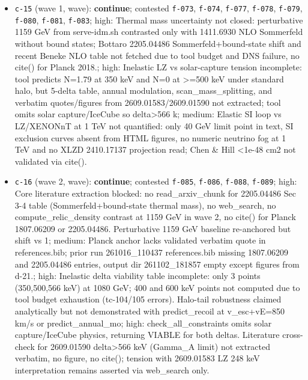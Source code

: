 \documentclass[11pt,a4paper]{article}
\begin{document}
\begin{itemize}
  \item \texttt{c-15} (wave 1, wave): \textbf{continue}; contested \texttt{f-073}, \texttt{f-074}, \texttt{f-077}, \texttt{f-078}, \texttt{f-079}, \texttt{f-080}, \texttt{f-081}, \texttt{f-083}; high: Thermal mass uncertainty not closed: perturbative 1159 GeV from serve-idm.sh contrasted only with 1411.6930 NLO Sommerfeld without bound states; Bottaro 2205.04486 Sommerfeld+bound-state shift and recent Beneke NLO table not fetched due to tool budget and DNS failure, no cite() for Planck 2018.; high: Inelastic LZ vs solar-capture tension incomplete: tool predicts N=1.79 at 350 keV and N=0 at \textgreater{}=500 keV under standard halo, but 5-delta table, annual modulation, scan\_mass\_splitting, and verbatim quotes/figures from 2609.01583/2609.01590 not extracted; tool omits solar capture/IceCube so delta\textgreater{}566 k; medium: Elastic SI loop vs LZ/XENONnT at 1 TeV not quantified: only 40 GeV limit point in text, SI exclusion curves absent from HTML figures, no numeric neutrino fog at 1 TeV and no XLZD 2410.17137 projection read; Chen \& Hill \textless{}1e-48 cm2 not validated via cite().
  \item \texttt{c-16} (wave 2, wave): \textbf{continue}; contested \texttt{f-085}, \texttt{f-086}, \texttt{f-088}, \texttt{f-089}; high: Core literature extraction blocked: no read\_arxiv\_chunk for 2205.04486 Sec 3-4 table (Sommerfeld+bound-state thermal mass), no web\_search, no compute\_relic\_density contrast at 1159 GeV in wave 2, no cite() for Planck 1807.06209 or 2205.04486. Perturbative 1159 GeV baseline re-anchored but shift vs 1; medium: Planck anchor lacks validated verbatim quote in references.bib; prior run 261016\_110437 references.bib missing 1807.06209 and 2205.04486 entries, output dir 261102\_181857 empty except figures from d-21.; high: Inelastic delta viability table incomplete: only 3 points (350,500,566 keV) at 1080 GeV; 400 and 600 keV points not computed due to tool budget exhaustion (tc-104/105 errors). Halo-tail robustness claimed analytically but not demonstrated with predict\_recoil at v\_esc+vE=850 km/s or predict\_annual\_mo; high: check\_all\_constraints omits solar capture/IceCube physics, returning VIABLE for both deltas. Literature cross-check for 2609.01590 delta\textgreater{}566 keV (Gamma\_A limit) not extracted verbatim, no figure, no cite(); tension with 2609.01583 LZ 248 keV interpretation remains asserted via web\_search only.

\end{itemize}
\end{document}
